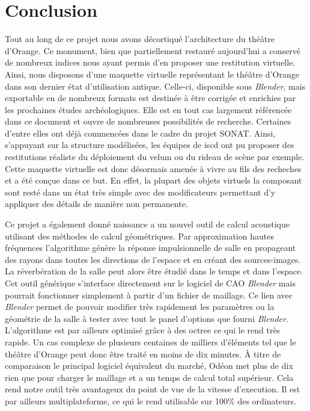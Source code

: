 \chapter*{Conclusion}
	
	
Tout au long de ce projet nous avons décortiqué l'architecture du théâtre d'Orange. Ce monument, bien que partiellement restauré aujourd'hui a conservé de nombreux indices nous ayant permis d'en proposer une restitution virtuelle. Ainsi, nous disposons d'une maquette virtuelle représentant le théâtre d'Orange dans son dernier état d'utilisation antique. Celle-ci, disponible sous \textit{Blender}, mais exportable en de nombreux formats est destinée à être corrigée et enrichies par les prochaines études archéologiques. Elle est en tout cas largement référencée dans ce document et ouvre de nombreuses possibilités de recherche. Certaines d'entre elles ont déjà commencées dans le cadre du projet SONAT. Ainsi, s'appuyant sur la structure modélisées, les équipes de \gls{iscd} ont pu proposer des restitutions réaliste du déploiement du \gls{velum} ou du rideau de scène par exemple. Cette maquette virtuelle est donc désormais amenée à vivre au fils des recheches et a été conçue dans ce but. En effet, la plupart des objets virtuels la composant sont resté dans un état très simple avec des \glspl{modificateur} permettant d'y appliquer des détails de manière non permanente.

Ce projet a également donné naissance a un nouvel outil de calcul acoustique utilisant des méthodes de calcul géométriques. Par approximation hautes fréquences l'algorithme génère la réponse impulsionnelle de salle en propageant des rayons dans toutes les directions de l'espace et en créant des sources-images. La réverbération de la salle peut alors être étudié dans le temps et dans l'espace. Cet outil générique s'interface directement sur le logiciel de \gls{CAO} \textit{Blender} mais pourrait fonctionner simplement à partir d'un fichier de maillage. Ce lien avec \textit{Blender} permet de pouvoir modifier très rapidement les paramètres ou la géométrie de la salle à tester avec tout le panel d'options que fourni \textit{Blender}. L'algorithme est par ailleurs optimisé grâce à des \gls{octree} ce qui le rend très rapide. Un cas complexe de plusieurs centaines de milliers d'éléments tel que le théâtre d'Orange peut donc être traité en moins de dix minutes. À titre de comparaison le principal logiciel équivalent du marché, Odéon met plus de dix rien que pour charger le maillage et a un temps de calcul total supérieur. Cela rend notre outil très avantageux du point de vue de la vitesse d'execution. Il est par ailleurs multiplateforme, ce qui le rend utilisable sur 100\% des ordinateurs. 